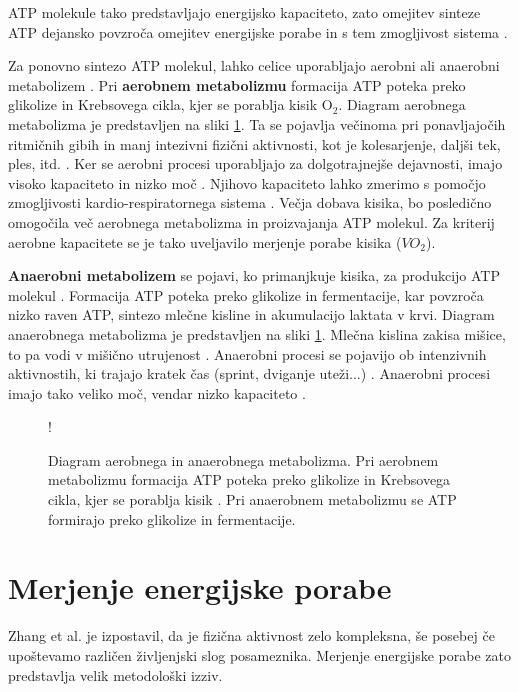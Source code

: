 ATP molekule tako predstavljajo energijsko kapaciteto, zato omejitev sinteze ATP dejansko povzroča omejitev energijske porabe in s tem zmogljivost sistema \cite{sahlin1998energy}. 

Za ponovno sintezo ATP molekul, lahko celice uporabljajo aerobni ali anaerobni metabolizem \cite{scott2005misconceptions}. Pri \textbf{aerobnem metabolizmu} formacija ATP poteka preko glikolize in Krebsovega cikla, kjer se porablja kisik $\mathrm{O}_2$. Diagram aerobnega metabolizma je predstavljen na sliki \ref{fig:metabolism}. Ta se pojavlja večinoma pri ponavljajočih ritmičnih gibih in manj intezivni fizični aktivnosti, kot je kolesarjenje, daljši tek, ples, itd. \cite{patel2017aerobic}. Ker se aerobni procesi uporabljajo za dolgotrajnejše dejavnosti, imajo visoko kapaciteto in nizko moč \cite{sahlin1998energy}. Njihovo kapaciteto lahko zmerimo s pomočjo zmogljivosti kardio-respiratornega sistema \cite{patel2017aerobic}. Večja dobava kisika, bo posledično omogočila več aerobnega metabolizma in proizvajanja ATP molekul. Za kriterij aerobne kapacitete se je tako uveljavilo merjenje porabe kisika (${VO}_2$).

\textbf{Anaerobni metabolizem} se pojavi, ko primanjkuje kisika, za produkcijo ATP molekul \cite{patel2017aerobic}. Formacija ATP poteka preko glikolize in fermentacije, kar povzroča nizko raven ATP, sintezo mlečne kisline in akumulacijo laktata v krvi. Diagram anaerobnega metabolizma je predstavljen na sliki \ref{fig:metabolism}. Mlečna kislina zakisa mišice, to pa vodi v mišično utrujenost \cite{sahlin1998energy}. Anaerobni procesi se pojavijo ob intenzivnih aktivnostih, ki trajajo kratek čas (sprint, dviganje uteži...) \cite{patel2017aerobic}. Anaerobni procesi imajo tako veliko moč, vendar nizko kapaciteto \cite{sahlin1998energy}.


\begin{figure}[htb]
\centering
\resizebox {\columnwidth} {!}{

}
 \caption[Diagram aerobnega in anaerobnega metabolizma]{Diagram aerobnega in anaerobnega metabolizma. Pri aerobnem metabolizmu formacija ATP poteka preko glikolize in Krebsovega cikla, kjer se porablja kisik \cite{scott2005misconceptions}. Pri anaerobnem metabolizmu se ATP formirajo preko glikolize in fermentacije.}
 \label{fig:metabolism}
\end{figure}






\section{Merjenje energijske porabe}\label{sec:merjenje}
Zhang et al. \cite{zhang2004improving} je izpostavil, da je fizična aktivnost zelo kompleksna, še posebej če upoštevamo različen življenjski slog posameznika. Merjenje energijske porabe zato predstavlja velik metodološki izziv.

